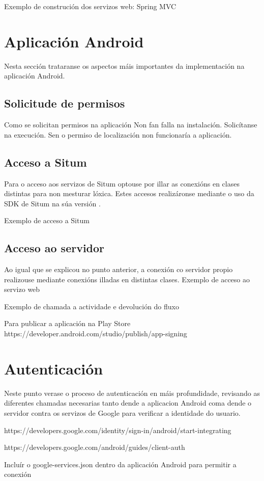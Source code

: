 Exemplo de construción dos servizos web: Spring MVC















\section{Aplicación Android}
Nesta sección trataranse os aspectos máis importantes da implementación na aplicación Android.
\subsection{Solicitude de permisos}
Como se solicitan permisos na aplicación
Non fan falla na instalación. Solicítanse na execución. Sen o permiso de localización non funcionaría a aplicación.

\subsection{Acceso a Situm}
Para o acceso aos servizos de Situm optouse por illar as conexións en clases distintas para non mesturar lóxica. Estes accesos realizáronse mediante o uso da SDK de Situm na súa versión .

Exemplo de acceso a Situm

\subsection{Acceso ao servidor}
Ao igual que se explicou no punto anterior, a conexión co servidor propio realizouse mediante conexións illadas en distintas clases. 
Exemplo de acceso ao servizo web




Exemplo de chamada a actividade e devolución do fluxo

Para publicar a aplicación na Play Store
https://developer.android.com/studio/publish/app-signing




\section{Autenticación}
Neste punto verase o proceso de autenticación en máis profundidade, revisando as diferentes chamadas necesarias tanto dende a aplicacion Android coma dende o servidor contra os servizos de Google para verificar a identidade do usuario.




https://developers.google.com/identity/sign-in/android/start-integrating


https://developers.google.com/android/guides/client-auth


Incluír o google-services.json dentro da aplicación Android para permitir a conexión